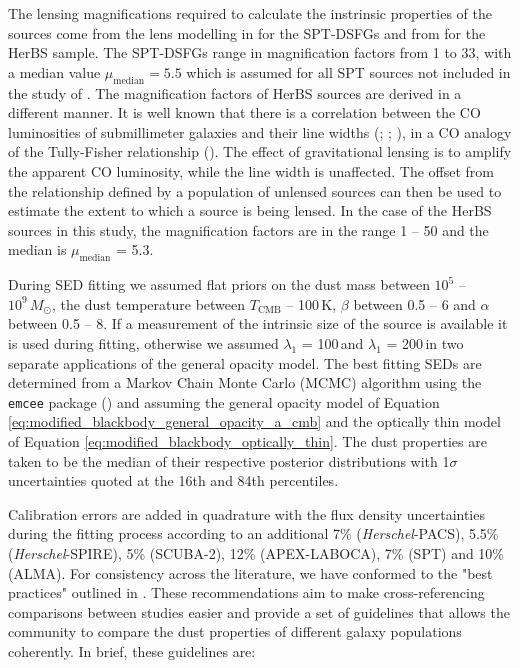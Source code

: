 The lensing magnifications required to calculate the instrinsic properties of the sources come from the lens modelling in \citealt{Spilker_2016} for the SPT-DSFGs and from \citealt{Urquhart_2022} for the HerBS sample. The SPT-DSFGs range in magnification factors from 1 to 33, with a median value $\mu_{\textrm{median}} = 5.5$ which is assumed for all SPT sources not included in the study of \citealt{Spilker_2016}. The magnification factors of HerBS sources are derived in a different manner. It is well known that there is a correlation between the CO luminosities of submillimeter galaxies and their line widths (\citealt{Bothwell_2013}; \citealt{Dannerbauer_2017}; \citealt{Neri_2020}), in a CO analogy of the Tully-Fisher relationship (\citealt{Tully_1977}). The effect of gravitational lensing is to amplify the apparent CO luminosity, while the line width is unaffected. The offset from the relationship defined by a population of unlensed sources can then be used to estimate the extent to which a source is being lensed. In the case of the HerBS sources in this study, the magnification factors are in the range 1 -- 50 and the median is $\mu_{\textrm{median}}$ = 5.3.

During SED fitting we assumed flat priors on the dust mass between $10^5$ -- $10^9\,M_\odot$, the dust temperature between $T_{\textrm{CMB}}$ -- 100\,K, $\beta$ between 0.5 -- 6 and $\alpha$ between 0.5 -- 8. If a measurement of the intrinsic size of the source is available it is used during fitting, otherwise we assumed $\lambda_1$ = 100\,\micron and $\lambda_1$ = 200\,\micron in two separate applications of the general opacity model. The best fitting SEDs are determined from a Markov Chain Monte Carlo (MCMC) algorithm using the \texttt{emcee} package (\citealt{Foreman-Mackey_2013}) and assuming the general opacity model of Equation \ref{eq:modified_blackbody_general_opacity_a_cmb} and the optically thin model of Equation \ref{eq:modified_blackbody_optically_thin}. The dust properties are taken to be the median of their respective posterior distributions with 1$\sigma$ uncertainties quoted at the 16th and 84th percentiles. 

Calibration errors are added in quadrature with the flux density uncertainties during the fitting process according to an additional 7\% (\textit{Herschel}-PACS), 5.5\% (\textit{Herschel}-SPIRE), 5\% (SCUBA-2), 12\% (APEX-LABOCA), 7\% (SPT) and 10\% (ALMA). For consistency across the literature, we have conformed to the "best practices" outlined in \citealt{Drew_2022}. These recommendations aim to make cross-referencing comparisons between studies easier and provide a set of guidelines that allows the community to compare the dust properties of different galaxy populations coherently. In brief, these guidelines are: 

